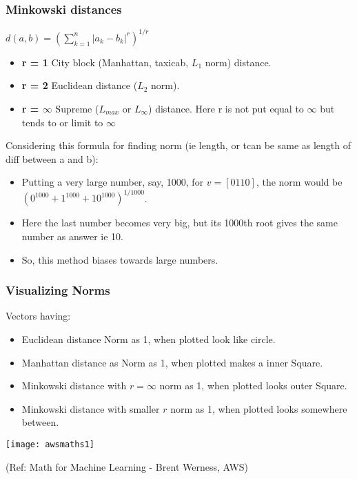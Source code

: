 \begin{frame}[fragile]\frametitle{Minkowski distances}

$d(a,b) = \left(\sum_{k=1}^{n} |a_k - b_k|^{r}\right) ^{1/r}$

	\begin{itemize}
		\item {\bf r = 1} City block (Manhattan, taxicab, $L_{1}$ norm) distance.
		\item {\bf r = 2} Euclidean distance ($L_{2}$ norm).
		\item {\bf r = $\infty$} Supreme ($L_{max}$ or $L_{\infty}$) distance. Here r is not put equal to $\infty$ but tends to or limit to $\infty$
\end{itemize}

Considering this formula for finding norm (ie length, or tcan be same as length of diff between a and b):

	\begin{itemize}
		\item Putting a very large number, say, 1000, for $v=[0 1 10]$, the norm would be $(0^1000 + 1^1000 + 10^1000)^{1/1000}$. 
		\item Here the last number becomes very big, but its 1000th root gives the same number as answer ie 10. 

		\item So, this method biases towards large numbers.
\end{itemize}
		
\end{frame}

\begin{frame}[fragile] \frametitle{Visualizing Norms}


Vectors having:

	\begin{itemize}
		\item Euclidean distance Norm as 1, when plotted look like circle.
		\item Manhattan distance as Norm as 1, when plotted makes a inner Square.
		\item Minkowski distance with $r=\infty$ norm as 1, when plotted looks outer Square.
				\item Minkowski distance with smaller $r$ norm as 1, when plotted looks somewhere between.
\end{itemize}

\begin{center}
\texttt{[image: awsmaths1]}
\end{center}

{\tiny (Ref: Math for Machine Learning - Brent Werness, AWS)}

\end{frame}


